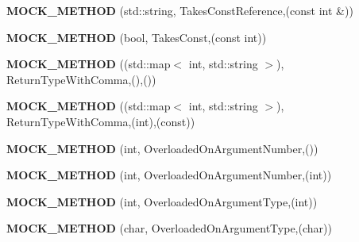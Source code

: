 \begin{DoxyCompactItemize}
{\bfseries M\+O\+C\+K\+\_\+\+M\+E\+T\+H\+OD} (std\+::string, Takes\+Const\+Reference,(const int \&))
\item 
\mbox{\label{classtesting_1_1gmock__function__mocker__test_1_1MockFoo_a68193fcc8b336763c92cb1c8fd7a97ea}} 
{\bfseries M\+O\+C\+K\+\_\+\+M\+E\+T\+H\+OD} (bool, Takes\+Const,(const int))
\item 
\mbox{\label{classtesting_1_1gmock__function__mocker__test_1_1MockFoo_a8fdcae66e6f4efa07a57580235ca3323}} 
{\bfseries M\+O\+C\+K\+\_\+\+M\+E\+T\+H\+OD} ((std\+::map$<$ int, std\+::string $>$), Return\+Type\+With\+Comma,(),())
\item 
\mbox{\label{classtesting_1_1gmock__function__mocker__test_1_1MockFoo_adfb6a040264fc42059f0b47e3f21e2df}} 
{\bfseries M\+O\+C\+K\+\_\+\+M\+E\+T\+H\+OD} ((std\+::map$<$ int, std\+::string $>$), Return\+Type\+With\+Comma,(int),(const))
\item 
\mbox{\label{classtesting_1_1gmock__function__mocker__test_1_1MockFoo_ae7564f6d942087d67512b521fb355f94}} 
{\bfseries M\+O\+C\+K\+\_\+\+M\+E\+T\+H\+OD} (int, Overloaded\+On\+Argument\+Number,())
\item 
\mbox{\label{classtesting_1_1gmock__function__mocker__test_1_1MockFoo_ab859902d52f376112fa8c8d5ca402d8a}} 
{\bfseries M\+O\+C\+K\+\_\+\+M\+E\+T\+H\+OD} (int, Overloaded\+On\+Argument\+Number,(int))
\item 
\mbox{\label{classtesting_1_1gmock__function__mocker__test_1_1MockFoo_a6c4bc14602957c662e9ace719cf0fd96}} 
{\bfseries M\+O\+C\+K\+\_\+\+M\+E\+T\+H\+OD} (int, Overloaded\+On\+Argument\+Type,(int))
\item 
\mbox{\label{classtesting_1_1gmock__function__mocker__test_1_1MockFoo_ae7680c58ebcf5f91c5f190043528b313}} 
{\bfseries M\+O\+C\+K\+\_\+\+M\+E\+T\+H\+OD} (char, Overloaded\+On\+Argument\+Type,(char))
\item 

\end{DoxyCompactItemize}
